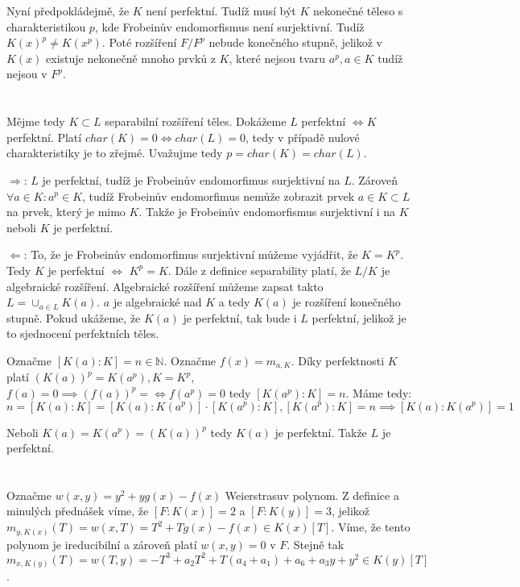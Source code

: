 \documentclass[12pt, a4paper]{article}
\begin{document}
Nyní předpokládejmě, že $K$ není perfektní. Tudíž musí být $K$ nekonečné těleso s charakteristikou $p$, kde Frobeinův endomorfismus není surjektivní. Tudíž $K(x)^p \neq K(x^p)$. Poté rozšíření $F/F^p$ nebude konečného stupně, jelikož v $K(x)$ existuje nekonečně mnoho prvků z $K$, které nejsou tvaru $a^p, a \in K$ tudíž nejsou v $F^p$.

\section{}
Mějme tedy $K \subset L$ separabilní rozšíření těles. Dokážeme $L$ perfektní $\iff K$ perfektní. Platí $char(K) = 0 \iff char(L) = 0$, tedy v případě nulové charakteristiky je to zřejmé. Uvažujme tedy $p = char(K) = char(L)$.

$\Rightarrow$: $L$ je perfektní, tudíž je Frobeinův endomorfimus surjektivní na $L$. Zároveň $\forall a \in K: a^p \in K$, tudíž Frobeinův endomorfimus nemůže zobrazit prvek $a \in K \subset L$ na prvek, který je mimo $K$. Takže je Frobeinův endomorfismus surjektivní i na $K$ neboli $K$ je perfektní.

$\Leftarrow$: To, že je Frobeinův endomorfimus surjektivní můžeme vyjádřit, že $K = K^p$. Tedy $K$ je perfektní $\iff$ $K^p = K$. Dále z definice separability platí, že $L/K$ je algebraické rozšíření. Algebraické rozšíření můžeme zapsat takto $L = \cup_{a\in L} K(a)$. $a$ je algebraické nad $K$ a tedy $K(a)$ je rozšíření konečného stupně. Pokud ukážeme, že $K(a)$ je perfektní, tak bude i $L$ perfektní, jelikož je to sjednocení perfektních těles.

Označme $[K(a):K]=n \in \mathbb{N}$. Označme $f(x)=m_{a,K}$. Díky perfektnosti $K$ platí $(K(a))^p = K(a^p), K = K^p$, $f(a)=0 \implies (f(a))^p = \iff f(a^p)=0$ tedy $[K(a^p):K] = n$. Máme tedy:
\[
n=[K(a):K]=[K(a):K(a^p)]\cdot [K(a^p):K], [K(a^p):K] =n \implies [K(a):K(a^p)] = 1
\]

Neboli $K(a)=K(a^p)=(K(a))^p$ tedy $K(a)$ je perfektní. Takže $L$ je perfektní.

\section{}
Označme $w(x,y) = y^2 + yg(x) - f(x)$ Weierstrasuv polynom. Z definice a minulých přednášek víme, že $[F:K(x)]=2$ a $[F:K(y)] = 3$, jelikož $m_{y,K(x)}(T) = w(x,T) = T^2 + Tg(x) - f(x) \in K(x)[T]$. Víme, že tento polynom je ireducibilní a zároveň platí $w(x,y) = 0$ v $F$. Stejně tak $m_{x,K(y)}(T) = w(T,y) = -T^3 + a_2T^2 + T(a_4+a_1) + a_6 + a_3y + y^2 \in K(y)[T]$. 
\end{document}
